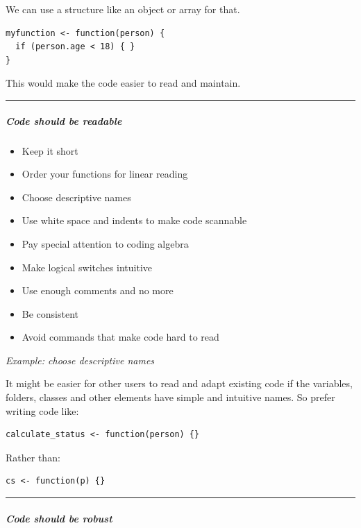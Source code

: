 \documentclass[
]{book}
\providecommand{\tightlist}{%
  \setlength{\itemsep}{0pt}\setlength{\parskip}{0pt}}
\theoremstyle{definition}
\theoremstyle{definition}
\theoremstyle{definition}
\theoremstyle{definition}
\theoremstyle{remark}
\begin{document}
We can use a structure like an object or array for that.

\begin{verbatim}
myfunction <- function(person) {
  if (person.age < 18) { }
}
\end{verbatim}

This would make the code easier to read and maintain.

\begin{center}\rule{0.5\linewidth}{0.5pt}\end{center}

\hypertarget{code-should-be-readable}{%
\subparagraph{Code should be readable}\label{code-should-be-readable}}

\begin{itemize}
\tightlist
\item
  Keep it short
\item
  Order your functions for linear reading
\item
  Choose descriptive names
\item
  Use white space and indents to make code scannable
\item
  Pay special attention to coding algebra
\item
  Make logical switches intuitive
\item
  Use enough comments and no more
\item
  Be consistent
\item
  Avoid commands that make code hard to read
\end{itemize}

\emph{Example: choose descriptive names}

It might be easier for other users to read and adapt existing code if the variables, folders, classes and other elements have simple and intuitive names. So prefer writing code like:

\begin{verbatim}
calculate_status <- function(person) {}
\end{verbatim}

Rather than:

\begin{verbatim}
cs <- function(p) {}
\end{verbatim}

\begin{center}\rule{0.5\linewidth}{0.5pt}\end{center}

\hypertarget{code-should-be-robust}{%
\subparagraph{Code should be robust}\label{code-should-be-robust}}
\end{document}
